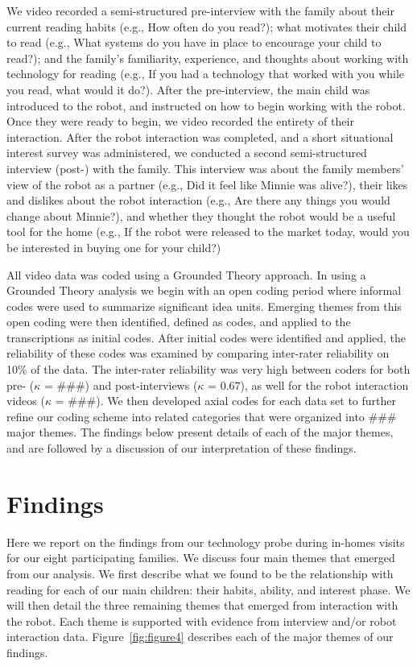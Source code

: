 \documentclass{sigchi}
\begin{document}
  We video recorded a semi-structured pre-interview with the family about their current reading habits (e.g., How often do you read?); what motivates their child to read (e.g., What systems do you have in place to encourage your child to read?); and the family's familiarity, experience, and thoughts about working with technology for reading (e.g., If you had a technology that worked with you while you read, what would it do?). After the pre-interview, the main child was introduced to the robot, and instructed on how to begin working with the robot. Once they were ready to begin, we video recorded the entirety of their interaction. After the robot interaction was completed, and a short situational interest survey was administered, we conducted a second semi-structured interview (post-) with the family. This interview was about the family members' view of the robot as a partner (e.g., Did it feel like Minnie was alive?), their likes and dislikes about the robot interaction (e.g., Are there any things you would change about Minnie?), and whether they thought the robot would be a useful tool for the home (e.g., If the robot were released to the market today, would you be interested in buying one for your child?)
  
  All video data was coded using a Grounded Theory \cite{Glaser:1967,Charmaz:2012} approach. In using a Grounded Theory analysis we begin with an open coding period where informal codes were used to summarize significant idea units.  Emerging themes from this open coding were then identified, defined as codes, and applied to the transcriptions as initial codes. After initial codes were identified and applied, the reliability of these codes was examined by comparing inter-rater reliability on 10\% of the data. The inter-rater reliability was very high between coders for both pre- ($\kappa$ = \#\#\#) and post-interviews ($\kappa$ = 0.67), as well for the robot interaction videos ($\kappa$ = \#\#\#). We then developed axial codes for each data set to further refine our coding scheme into related categories that were organized into \#\#\# major themes. The findings below present details of each of the major themes, and are followed by a discussion of our interpretation of these findings.
 
\section{Findings}
Here we report on the findings from our technology probe during in-homes visits for our eight participating families. We discuss four main themes that emerged from our analysis. We first describe what we found to be the relationship with reading for each of our main children: their habits, ability, and interest phase. We will then detail the three remaining themes that emerged from interaction with the robot. Each theme is supported with evidence from interview and/or robot interaction data. Figure~\ref{fig:figure4} describes each of the major themes of our findings. 
\end{document}
